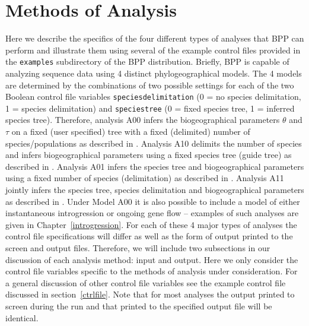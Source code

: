 \documentclass[a4paper]{book}
\numberwithin{equation}{section} \renewcommand{\baselinestretch}{0.55}
\begin{document}
 \chapter{Methods of Analysis} \label{analysismethods} Here we
 describe the specifics of the four different types of analyses that
 BPP can perform and illustrate them using several of
 the example control files provided in the
 \texttt{examples} subdirectory of the BPP distribution. Briefly, BPP is
 capable of analyzing sequence data using 4 distinct phylogeographical
 models. The 4 models are determined by the combinations of two
 possible settings for each of the two Boolean control file variables
 \texttt{speciesdelimitation} (0 = no species delimitation, 1 =
 species delimitation) and \texttt{speciestree} (0 = fixed species
 tree, 1 = inferred species tree). Therefore, analysis A00 infers the
 biogeographical parameters $\theta$ and $\tau$ on a fixed (user
 specified) tree with a fixed (delimited) number of
 species/populations as described in \cite{Rannala2003}.  Analysis A10
 delimits the number of species and infers biogeographical parameters
 using a fixed species tree (guide tree) as described in
 \cite{Yang2010}.  Analysis A01 infers the species tree and
 biogeographical parameters using a fixed number of species
 (delimitation) as described in \cite{Rannala2017}.  Analysis A11
 jointly infers the species tree, species delimitation and
 biogeographical parameters as described in \cite{Yang2014a}. Under
 Model A00 it is also possible to include a model of either instantaneous
 introgression or ongoing gene flow -- examples of such analyses are given in
 Chapter~\ref{introgression}.
 For each of these 4 major types of analyses the control file specifications
 will differ as well as the form of output printed to the screen and output
 files. Therefore, we will include two subsections in our discussion
 of each analysis method: input and output. Here we only consider the
 control file variables specific to the methods of analysis under
 consideration. For a general discussion of other control file
 variables see the example control file discussed in
 section~\ref{ctrlfile}. Note that for most analyses the output printed
 to screen during the run and that printed to the specified output
 file will be identical.
\end{document}
